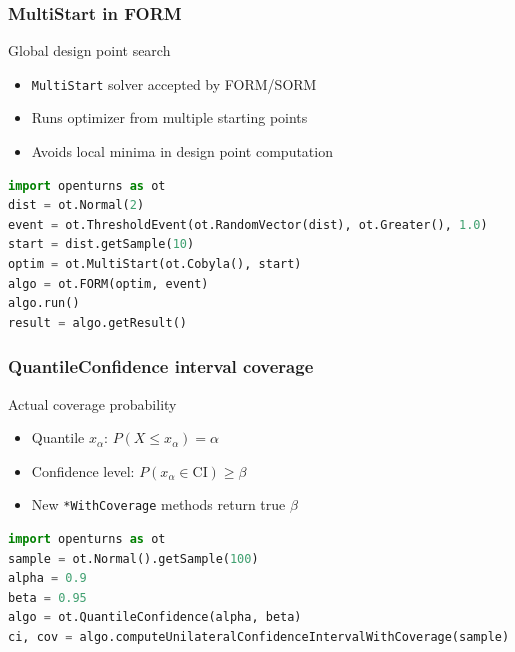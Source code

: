 \documentclass[aspectratio=169]{beamer}
\begin{document}
\begin{frame}[fragile]
\frametitle{MultiStart in FORM}

\begin{block}{Global design point search}
\begin{itemize}
\item \texttt{MultiStart} solver accepted by FORM/SORM
\item Runs optimizer from multiple starting points
\item Avoids local minima in design point computation
\end{itemize}
\end{block}

\begin{lstlisting}[language=Python]
import openturns as ot
dist = ot.Normal(2)
event = ot.ThresholdEvent(ot.RandomVector(dist), ot.Greater(), 1.0)
start = dist.getSample(10)
optim = ot.MultiStart(ot.Cobyla(), start)
algo = ot.FORM(optim, event)
algo.run()
result = algo.getResult()
\end{lstlisting}

\end{frame}

\begin{frame}[fragile]
\frametitle{QuantileConfidence interval coverage}

\begin{block}{Actual coverage probability}
\begin{itemize}
\item Quantile $x_\alpha$: $P(X \leq x_\alpha) = \alpha$
\item Confidence level: $P(x_\alpha \in \text{CI}) \ge \beta$
\item New \texttt{*WithCoverage} methods return true $\beta$
\end{itemize}
\end{block}

\begin{lstlisting}[language=Python]
import openturns as ot
sample = ot.Normal().getSample(100)
alpha = 0.9
beta = 0.95
algo = ot.QuantileConfidence(alpha, beta)
ci, cov = algo.computeUnilateralConfidenceIntervalWithCoverage(sample)
\end{lstlisting}

\end{frame}
\end{document}
